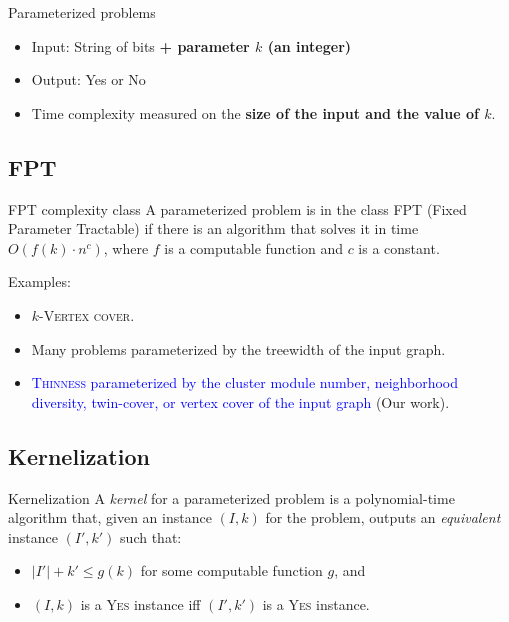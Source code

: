 \documentclass{beamer}
\begin{document}
\begin{frame}{Parameterized problems}
    \begin{itemize}
    \item Input: String of bits \textbf{+ parameter $k$ (an integer)}
    \item Output: Yes or No
    \item Time complexity measured on the \textbf{size of the input and the value of $k$}.
    \end{itemize}
\end{frame}

\subsection{FPT}
\begin{frame}{FPT complexity class}
    A parameterized problem is in the class FPT (Fixed Parameter Tractable) if there is an algorithm that solves it in time $O(f(k) \cdot n^c)$, where $f$ is a computable function and $c$ is a constant.
    \pause

    Examples:
    \begin{itemize}
        \item<2-> $k$-\textsc{Vertex cover}.
        \item<3-> Many problems parameterized by the treewidth of the input graph.
        \item<4-> \textcolor{blue}{\textsc{Thinness} parameterized by the cluster module number, neighborhood diversity, twin-cover, or vertex cover of the input graph} (Our work).
    \end{itemize}
\end{frame}

\subsection{Kernelization}
\begin{frame}{Kernelization}
    A \emph{kernel} for a parameterized problem is a polynomial-time algorithm that, given an instance $(I,k)$ for the problem, outputs an \emph{equivalent} instance $(I',k')$ such that:
    \begin{itemize}
        \item $|I'| + k' \leq g(k)$ for some computable function $g$, and
        \item $(I,k)$ is a \textsc{Yes} instance iff $(I',k')$ is a \textsc{Yes} instance.
    \end{itemize}
\end{frame}
\end{document}
